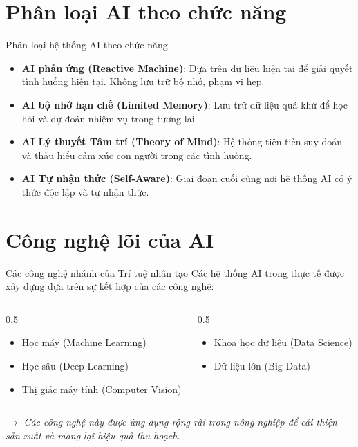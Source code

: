 \documentclass[aspectratio=169]{beamer}
\begin{document}
\section{Phân loại AI theo chức năng}
\begin{frame}{Phân loại hệ thống AI theo chức năng}
    \begin{itemize}
        \item \textbf{AI phản ứng (Reactive Machine)}: Dựa trên dữ liệu hiện tại để giải quyết tình huống hiện tại. Không lưu trữ bộ nhớ, phạm vi hẹp.
        \item \textbf{AI bộ nhớ hạn chế (Limited Memory)}: Lưu trữ dữ liệu quá khứ để học hỏi và dự đoán nhiệm vụ trong tương lai.
        \item \textbf{AI Lý thuyết Tâm trí (Theory of Mind)}: Hệ thống tiên tiến suy đoán và thấu hiểu cảm xúc con người trong các tình huống.
        \item \textbf{AI Tự nhận thức (Self-Aware)}: Giai đoạn cuối cùng nơi hệ thống AI có ý thức độc lập và tự nhận thức.
    \end{itemize}
\end{frame}

\section{Công nghệ lõi của AI}
\begin{frame}{Các công nghệ nhánh của Trí tuệ nhân tạo}
    Các hệ thống AI trong thực tế được xây dựng dựa trên sự kết hợp của các công nghệ:
    \vspace{0.3cm}
    \begin{columns}
        \begin{column}{0.5\textwidth}
            \begin{itemize}
                \item Học máy (Machine Learning)
                \item Học sâu (Deep Learning)
                \item Thị giác máy tính (Computer Vision)
            \end{itemize}
        \end{column}
        \begin{column}{0.5\textwidth}
            \begin{itemize}
                \item Khoa học dữ liệu (Data Science)
                \item Dữ liệu lớn (Big Data)
            \end{itemize}
        \end{column}
    \end{columns}
    \vspace{0.5cm}
    $\rightarrow$ \textit{Các công nghệ này được ứng dụng rộng rãi trong nông nghiệp để cải thiện sản xuất và mang lại hiệu quả thu hoạch.}
\end{frame}
\end{document}
